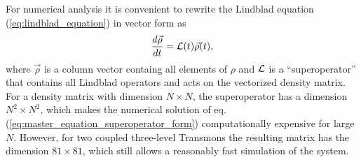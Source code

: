 For numerical analysis it is convenient to rewrite the Lindblad equation (\ref{eq:lindblad_equation}) in vector form as
%
\begin{equation}
\frac{d\vec{\rho}}{dt} = {\cal L}(t)\vec{\rho}(t), \label{eq:master_equation_superoperator_form}
\end{equation}
%
where $\vec{\rho}$ is a column vector containg all elements of $\rho$ and $\cal L$ is a ``superoperator'' that contains all Lindblad operators and acts on the vectorized density matrix. For a density matrix with dimension $N\times N$, the superoperator has a dimension $N^2 \times N^2$, which makes the numerical solution of eq. (\ref{eq:master_equation_superoperator_form}) computationally expensive for large $N$. However, for two coupled three-level Transmons the resulting matrix has the dimension $81\times 81$, which still allows a reasonably fast simulation of the system.







%
